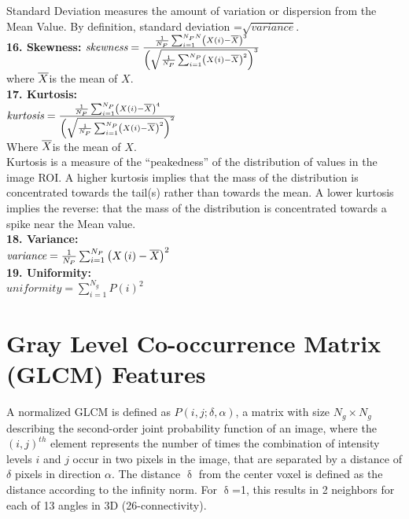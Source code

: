 {Standard Deviation measures the amount of variation or dispersion from the Mean Value. By definition, standard deviation =}$\sqrt{\textit{variance}}$.\\
{\textbf{16. Skewness:}}
$\textit{skewness}=\frac{\frac{1}{N_{P}}\sum _{i=1}^{N_{P}N}\left(X\left(i\right)-\overline{X}\right)^{3}}{\left(\sqrt{\frac{1}{N_{P}}\sum _{i=1}^{N_{P}}\left(X\left(i\right)-\overline{X}\right)^{2}}\right)^{3}}$\\
{where } $\overline{X}${is the mean of} $X$.\\
\textbf{17. Kurtosis:}\\
$\textit{kurtosis}=\frac{\frac{1}{N_{P}}\sum _{i=1}^{N_{P}}\left(X\left(i\right)-\overline{X}\right)^{4}}{\left(\sqrt{\frac{1}{N_{P}}\sum _{i=1}^{N_{P}}\left(X\left(i\right)-\overline{X}\right)^{2}}\right)^{2}}$\\
{Where } $\overline{X}${is the mean of} $X$.\\
{Kurtosis is a measure of the “peakedness” of the distribution of values in the image ROI. A higher kurtosis implies that the mass of the distribution is concentrated towards the tail(s) rather than towards the mean. A lower kurtosis implies the reverse: that the mass of the distribution is concentrated towards a spike near the Mean value.}\\
{\textbf{18. Variance:}}\\
$\textit{variance}=\frac{1}{N_{P}}\sum _{i=1}^{N_{P}}\left(X\left(i\right)-\overline{X}\right)^{2}$\\
\textbf{19. Uniformity:}\\
$\textit{uniformity}=\sum _{i=1}^{N_{g}}P\left(i\right)^{2}$



\section{Gray Level Co-occurrence Matrix (GLCM) Features}

A normalized GLCM is defined as $P\left(i,j;\delta ,\alpha \right)$, a matrix with size $N_{g}\times N_{g}$ describing the second-order joint probability function of an image, where the $\left(i,j\right)^{th}$ element represents the number of times the combination of intensity levels $i$ and $j$ occur in two pixels in the image, that are separated by a distance of $\delta $ pixels in direction $\alpha $. The distance $\updelta$ from the center voxel is defined as the distance according to the infinity norm. For $\updelta$=1, this results in 2 neighbors for each of 13 angles in 3D (26-connectivity).

